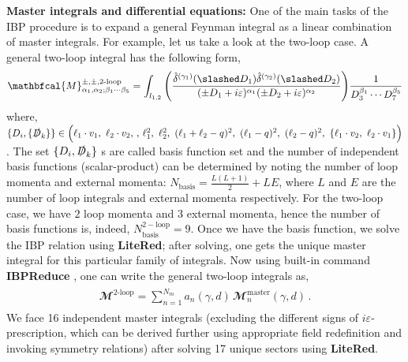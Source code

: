 \textbf{Master integrals and differential equations:}
One of the main tasks of the IBP procedure is to expand a general Feynman integral as a linear combination of master integrals. For example, let us take a look at the two-loop case. A general two-loop integral has the following form,
\begin{align}
    \begin{split}
        \mathbfcal{M}^{\pm,\pm,\textrm{2-loop}}_{\alpha_1,\alpha_2;\beta_1\cdots \beta_{5}}=\int_{l_{1,2}}\Bigg(\frac{\hat\delta^{(\gamma_1)}(\slashed D_1)\hat\delta^{(\gamma_2)}(\slashed D_2)}{(\pm D_1+i\varepsilon)^{\alpha_1}(\pm D_2+i\varepsilon)^{\alpha_2}}\Bigg)\frac{1}{D_3^{\beta_1}\cdots D_7^{\beta_5}}\label{3.4a}
    \end{split}
\end{align}
where, $\{D_i,\{\slashed D_k\}\}\in\Big(\ell_{1}\cdot v_1,\,\,\ell_{2}\cdot v_2,\,,\,\ell_{1}^2,\,\, \ell_{2}^2,\,\, (\ell_{1}+\ell_{2}-q)^2,\,\, (\ell_{1}-q)^2,\,\, (\ell_{2}-q)^2,\,\, \{\ell_{1}\cdot v_2,\,\, \ell_{2}\cdot v_1\}\Big) $. The set $\{D_i,\slashed D_k\}$ s are called basis function set and the number of independent basis functions (scalar-product) can be determined by noting the number of loop momenta and external momenta: $N_{\textrm{basis}}=\frac{L(L+1)}{2}+LE$, where $L$ and $E$ are the number of loop integrals and external momenta respectively. For the two-loop case, we have $2$ loop momenta and $3$ external momenta, hence the number of basis functions is, indeed, $N_{\textrm{basis}}^{2-\textrm{loop}}=9$. Once we have the basis function, we solve the IBP relation using \textbf{LiteRed}; after solving, one gets the unique master integral for this particular family of integrals. Now using built-in command \textbf{IBPReduce} \cite{Lee:2012cn,Lee:2013mka}, one can write the general two-loop integrals as,
\begin{align}
    \begin{split}
         \mathbfcal{M}^{\textrm{2-loop}}=\sum_{n=1}^{N_{m}} a_{n}(\gamma,d)\,\mathbfcal{M}^{\textrm{master}}_n(\gamma, d)\,.
    \end{split}
\end{align}
We face 16 independent master integrals (excluding the different signs of $i\varepsilon$-prescription, which can be derived further using appropriate field redefinition and invoking symmetry relations) after solving 17 unique sectors using \textbf{LiteRed}.

